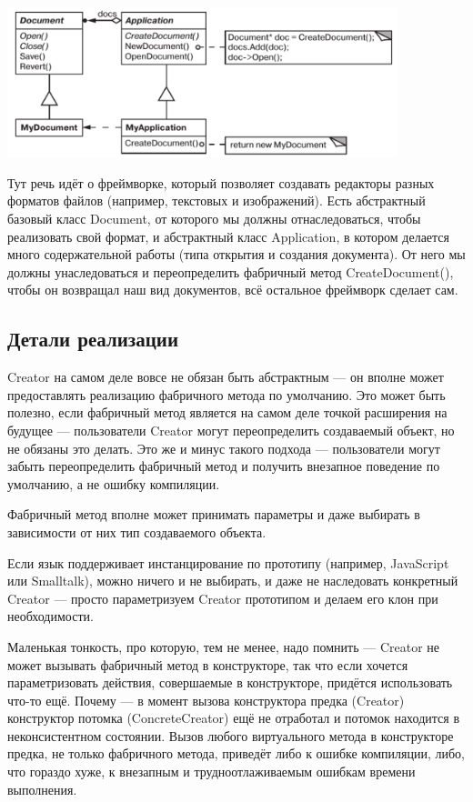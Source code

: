 \documentclass{../../text-style}
\begin{document}
\begin{center}
    \includegraphics[width=0.85\textwidth]{factoryMethodForTextEditor.png}
\end{center}

Тут речь идёт о фреймворке, который позволяет создавать редакторы разных форматов файлов (например, текстовых и изображений). Есть абстрактный базовый класс Document, от которого мы должны отнаследоваться, чтобы реализовать свой формат, и абстрактный класс Application, в котором делается много содержательной работы (типа открытия и создания документа). От него мы должны унаследоваться и переопределить фабричный метод CreateDocument(), чтобы он возвращал наш вид документов, всё остальное фреймворк сделает сам. 

\subsection{Детали реализации}

 Creator на самом деле вовсе не обязан быть абстрактным --- он вполне может предоставлять реализацию фабричного метода по умолчанию. Это может быть полезно, если фабричный метод является на самом деле точкой расширения на будущее --- пользователи Creator могут переопределить создаваемый объект, но не обязаны это делать. Это же и минус такого подхода --- пользователи могут забыть переопределить фабричный метод и получить внезапное поведение по умолчанию, а не ошибку компиляции.

 Фабричный метод вполне может принимать параметры и даже выбирать в зависимости от них тип создаваемого объекта. 
 
 Если язык поддерживает инстанцирование по прототипу (например, JavaScript или Smalltalk), можно ничего и не выбирать, и даже не наследовать конкретный Creator --- просто параметризуем Creator прототипом и делаем его клон при необходимости.

 Маленькая тонкость, про которую, тем не менее, надо помнить --- Creator не может вызывать фабричный метод в конструкторе, так что если хочется параметризовать действия, совершаемые в конструкторе, придётся использовать что-то ещё. Почему --- в момент вызова конструктора предка (Creator) конструктор потомка (ConcreteCreator) ещё не отработал и потомок находится в неконсистентном состоянии. Вызов любого виртуального метода в конструкторе предка, не только фабричного метода, приведёт либо к ошибке компиляции, либо, что гораздо хуже, к внезапным и трудноотлаживаемым ошибкам времени выполнения.
\end{document}
